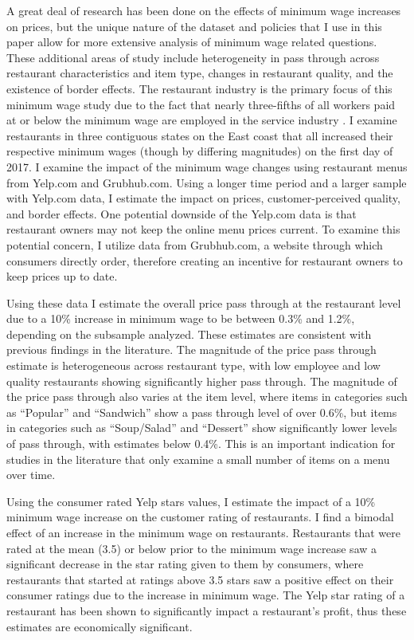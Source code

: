 \documentclass[11pt]{article}
\begin{document}
A great deal of research has been done on the effects of minimum wage increases on prices, but the unique nature of the dataset and policies that I use in this paper allow for more extensive analysis of minimum wage related questions. These additional areas of study include heterogeneity in pass through across restaurant characteristics and item type, changes in restaurant quality, and the existence of border effects. The restaurant industry is the primary focus of this minimum wage study due to the fact that nearly three-fifths of all workers paid at or below the minimum wage are employed in the service industry \cite{charsmw}. I examine restaurants in three contiguous states on the East coast that all increased their respective minimum wages (though by differing magnitudes) on the first day of 2017. I examine the impact of the minimum wage changes using restaurant menus from Yelp.com and Grubhub.com. Using a longer time period and a larger sample with Yelp.com data, I estimate the impact on prices, customer-perceived quality, and border effects. One potential downside of the Yelp.com data is that restaurant owners may not keep the online menu prices current. To examine this potential concern, I utilize data from Grubhub.com, a website through which consumers directly order, therefore creating an incentive for restaurant owners to keep prices up to date.

Using these data I estimate the overall price pass through at the restaurant level due to a 10\% increase in minimum wage to be between 0.3\% and 1.2\%, depending on the subsample analyzed. These estimates are consistent with previous findings in the literature. The magnitude of the price pass through estimate is heterogeneous across restaurant type, with low employee and low quality restaurants showing significantly higher pass through. The magnitude of the price pass through also varies at the item level, where items in categories such as ``Popular'' and ``Sandwich'' show a pass through level of over 0.6\%, but items in categories such as ``Soup/Salad'' and ``Dessert'' show significantly lower levels of pass through, with estimates below 0.4\%. This is an important indication for studies in the literature that only examine a small number of items on a menu over time. 

Using the consumer rated Yelp stars values, I estimate the impact of a 10\% minimum wage increase on the customer rating of restaurants. I find a bimodal effect of an increase in the minimum wage on restaurants. Restaurants that were rated at the mean (3.5) or below prior to the minimum wage increase saw a significant decrease in the star rating given to them by consumers, where restaurants that started at ratings above 3.5 stars saw a positive effect on their consumer ratings due to the increase in minimum wage. The Yelp star rating of a restaurant has been shown to significantly impact a restaurant's profit, thus these estimates are economically significant.  
\end{document}

